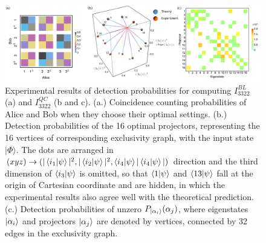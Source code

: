 \documentclass[pra,letterpaper,english,preprint,nofootinbib,aps,superscriptaddress,showkeys]{revtex4-1}
\theoremstyle{definition}
\theoremstyle{remark}
\begin{document}
 
  \begin{figure}[htbp]
     \centering
     \includegraphics[width = .97 \textwidth]{fig/exp-res-all.pdf}
     \caption{Experimental results of detection probabilities for computing $I_{3322}^{BL}$ (a) and $I_{3322}^{QC}$ (b and c).
     (a.) Coincidence counting probabilities of Alice and Bob when they choose their optimal settings.
     (b.) Detection probabilities of the 16 optimal projectors, representing the 16 vertices of corresponding exclusivity graph, with the input state $|\Phi\rangle$.
     The dots are arranged in $(xyz)\to(|\braket{i_1|\psi}|^2, |\braket{i_2|\psi}|^2, \braket{i_4|\psi}|\braket{i_4|\psi}|)$ direction and the third dimension of $\braket{i_3|\psi}$ is omitted, so that $\braket{1|\psi}$ and $\braket{13|\psi}$ fall at the origin of Cartesian coordinate and are hidden, in which the experimental results also agree well with the theoretical prediction.
     (c.) Detection probabilities of unzero $P_{\ket{\alpha_i}}(\alpha_j)$, where eigenstates $\ket{\alpha_i}$ and projectors  $\ket{\alpha_j}$ are denoted by vertices, connected by 32 edges in the exclusivity graph.
     }
     \label{fig:exp-res-all}
 \end{figure}
\end{document}
